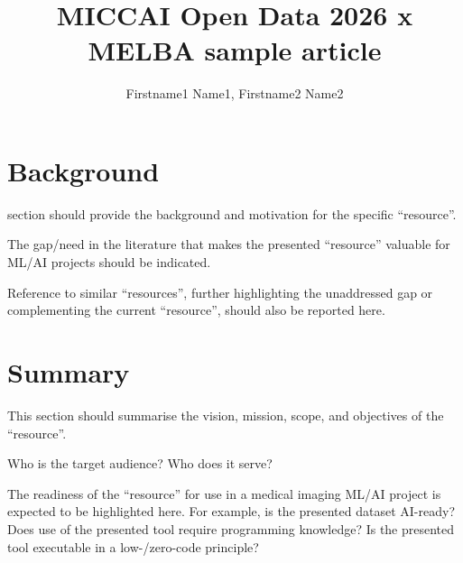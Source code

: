 \documentclass{melba}
\title{MICCAI Open Data 2026 x MELBA sample article}
\author{
	\firstname Firstname1 \surname Name1\aff{1,3},
	\name Firstname2 Name2\aff{2,3}\orcid{0000-1111-2222-3333}
}
\begin{document}
\twocolumn[\maketitle]

\section{Background}
	 section should provide the background and motivation for the specific “resource”.

	The gap/need in the literature that makes the presented “resource” valuable for ML/AI projects should be indicated.

	Reference to similar “resources”, further highlighting the unaddressed gap or complementing the current “resource”, should also be reported here.

\section{Summary}
	This section should summarise the vision, mission, scope, and objectives of the “resource”.

	Who is the target audience? Who does it serve?

	The readiness of the “resource” for use in a medical imaging ML/AI project is expected to be highlighted here. For example, is the presented dataset AI-ready? Does use of the presented tool require programming knowledge? Is the presented tool executable in a low-/zero-code principle?
\end{document}

